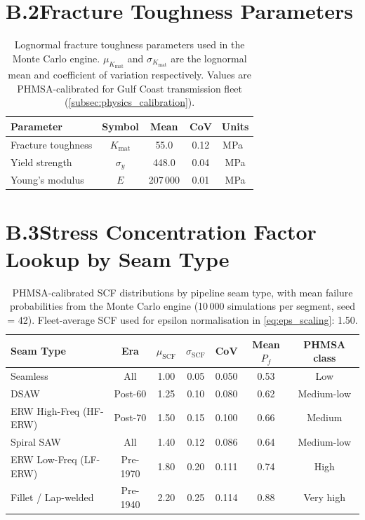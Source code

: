 \section*{B.2\quad Fracture Toughness Parameters}

\begin{table}[htbp]
  \centering
  \caption{Lognormal fracture toughness parameters used in the Monte
    Carlo engine.  $\mu_{K_\mathrm{mat}}$ and $\sigma_{K_\mathrm{mat}}$
    are the lognormal mean and coefficient of variation respectively.
    Values are PHMSA-calibrated for Gulf Coast transmission fleet
    (\cref{subsec:physics_calibration}).}
  \label{tab:toughness_params}
  \begin{tabular}{@{}lcccc@{}}
    \toprule
    Parameter & Symbol & Mean & CoV & Units \\
    \midrule
    Fracture toughness & $K_\mathrm{mat}$ & 55.0 & 0.12
      & \si{\mega\pascal\sqrt{\meter}} \\
    Yield strength & $\sigma_y$ & 448.0 & 0.04 & \si{\mega\pascal} \\
    Young's modulus & $E$ & 207\,000 & 0.01 & \si{\mega\pascal} \\
    \bottomrule
  \end{tabular}
\end{table}

\section*{B.3\quad Stress Concentration Factor Lookup by Seam Type}

\begin{table}[htbp]
  \centering
  \caption{PHMSA-calibrated SCF distributions by pipeline seam type,
    with mean failure probabilities from the Monte Carlo engine
    (10\,000 simulations per segment, seed = 42).  Fleet-average SCF
    used for epsilon normalisation in \cref{eq:eps_scaling}: 1.50.}
  \label{tab:scf_lookup}
  \begin{tabular}{@{}lcccccc@{}}
    \toprule
    Seam Type & Era & $\mu_\mathrm{SCF}$ & $\sigma_\mathrm{SCF}$
      & CoV & Mean $P_f$ & PHMSA class \\
    \midrule
    Seamless          & All    & 1.00 & 0.05 & 0.050 & 0.53 & Low \\
    DSAW              & Post-60 & 1.25 & 0.10 & 0.080 & 0.62 & Medium-low \\
    ERW High-Freq (HF-ERW) & Post-70 & 1.50 & 0.15 & 0.100 & 0.66 & Medium \\
    Spiral SAW        & All    & 1.40 & 0.12 & 0.086 & 0.64 & Medium-low \\
    ERW Low-Freq (LF-ERW) & Pre-1970 & 1.80 & 0.20 & 0.111 & 0.74 & High \\
    Fillet / Lap-welded & Pre-1940 & 2.20 & 0.25 & 0.114 & 0.88 & Very high \\
    \bottomrule
  \end{tabular}
\end{table}

